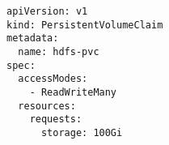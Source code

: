 \begin{verbatim}
apiVersion: v1
kind: PersistentVolumeClaim
metadata:
  name: hdfs-pvc
spec:
  accessModes:
    - ReadWriteMany
  resources:
    requests:
      storage: 100Gi
\end{verbatim}